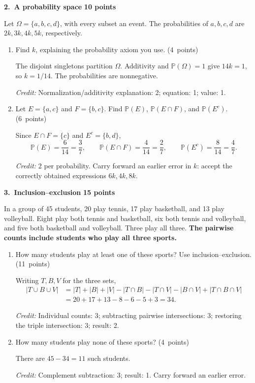 \documentclass[11pt,letterpaper]{article}
\newcommand{\Prob}{\mathbb P}
\newcommand{\partpts}[1]{\unskip\nobreak\hspace{.3em}%
  \mbox{\small\color{muted}(#1 points)}}
\newcommand{\credit}[1]{\par{\footnotesize\color{muted}\textit{Credit:} #1}}
\newcommand{\problem}[3]{\par\addvspace{9pt}%
  {\large\bfseries\color{indigo}#1.\ #2}\hfill
  {\small\color{muted}\textbf{#3 points}}\par\nobreak}
\begin{document}
\problem{2}{A probability space}{10}
Let $\Omega=\{a,b,c,d\}$, with every subset an event. The probabilities
of $a,b,c,d$ are $2k,3k,4k,5k$, respectively.
\begin{enumerate}
\item Find $k$, explaining the probability axiom you use. \partpts{4}
\begin{solution}[.6in]
The disjoint singletons partition $\Omega$. Additivity and
$\Prob(\Omega)=1$ give $14k=1$, so $k=1/14$. The probabilities are nonnegative.
\credit{Normalization/additivity explanation: 2; equation: 1; value: 1.}
\end{solution}
\item Let $E=\{a,c\}$ and $F=\{b,c\}$. Find $\Prob(E)$,
$\Prob(E\cap F)$, and $\Prob(E^c)$. \partpts{6}
\begin{solution}[.85in]
Since $E\cap F=\{c\}$ and $E^c=\{b,d\}$,
\[
\Prob(E)=\frac6{14}=\frac37,\qquad
\Prob(E\cap F)=\frac4{14}=\frac27,\qquad
\Prob(E^c)=\frac8{14}=\frac47.
\]
\credit{2 per probability. Carry forward an earlier error in $k$:
accept the correctly obtained expressions $6k,4k,8k$.}
\end{solution}
\end{enumerate}

\newpage
\problem{3}{Inclusion--exclusion}{15}
In a group of 45 students, 20 play tennis, 17 play basketball, and 13 play
volleyball. Eight play both tennis and basketball, six both tennis and
volleyball, and five both basketball and volleyball. Three play all three.
\textbf{The pairwise counts include students who play all three sports.}
\begin{enumerate}
\item How many students play at least one of these sports? Use
inclusion--exclusion. \partpts{11}
\begin{solution}[.95in]
Writing $T,B,V$ for the three sets,
\begin{align*}
|T\cup B\cup V|
&=|T|+|B|+|V|-|T\cap B|-|T\cap V|-|B\cap V|
 +|T\cap B\cap V|\\
&=20+17+13-8-6-5+3=34.
\end{align*}
\credit{Individual counts: 3; subtracting pairwise intersections: 3;
restoring the triple intersection: 3; result: 2.}
\end{solution}
\item How many students play none of these sports? \partpts{4}
\begin{solution}[.65in]
There are $45-34=11$ such students.
\credit{Complement subtraction: 3; result: 1. Carry forward an earlier error.}
\end{solution}
\end{enumerate}
\end{document}
